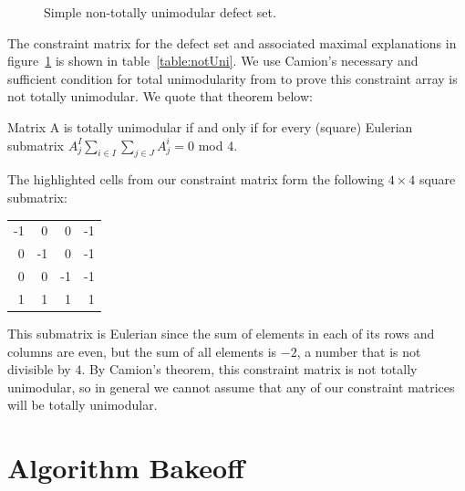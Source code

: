 \begin{figure}[htb] 
\caption{Simple non-totally unimodular defect set.}
\label{fig:notUni}
\end{figure}

The constraint matrix for the defect set and associated maximal explanations in figure~\ref{fig:notUni} is shown in table~\ref{table:notUni}. We use Camion's necessary and sufficient condition for total unimodularity from \cite{camion1965} to prove this constraint array is not totally unimodular.  We quote that theorem below:

\begin{thm}
Matrix A is totally unimodular if and only if for every (square) Eulerian submatrix $A_j^I \sum_{i\in I} \sum_{j \in J} A^i_j = 0$ mod 4.
\end{thm}

The highlighted cells from our constraint matrix form the following $4 \times 4$ square submatrix:

\begin{tabular}{rrrr}
-1 &  0 &  0 & -1 \\
 0 & -1 &  0 & -1 \\
 0 &  0 & -1 & -1 \\
 1 &  1 &  1 &  1 \\
\end{tabular}  

This submatrix is Eulerian since the sum of elements in each of its rows and columns are even, but the sum of all elements is $-2$, a number that is not divisible by $4$.  By Camion's theorem, this constraint matrix is not totally unimodular, so in general we cannot assume that any of our constraint matrices will be totally unimodular.

\section{Algorithm Bakeoff}

